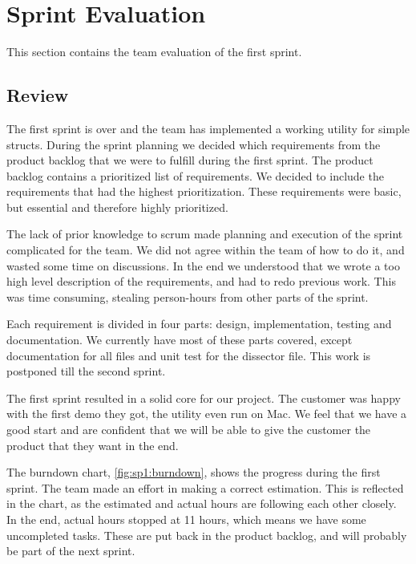 \section{Sprint Evaluation}
\label{sec:sp1:eval}
This section contains the team evaluation of the first sprint.

\subsection{Review}
The first sprint is over and the team has implemented a working \gls{utility} for simple structs. During
the sprint planning we decided which requirements from the product backlog that
we were to fulfill during the first sprint. The product backlog contains a
prioritized list of requirements. We decided to include the requirements that
had the highest prioritization. These requirements were basic, but essential
and therefore highly prioritized.
   
The lack of prior knowledge to \Gls{scrum} made planning and execution of the sprint
complicated for the team. We did not agree within the team of how to do it, and
wasted some time on discussions. In the end we understood
that we wrote a too high level description of the requirements, and had to redo
previous work. This was time consuming, stealing person-hours from other parts
of the sprint.

Each requirement is divided in four parts: design, implementation, testing and
documentation. We currently have most of these parts covered, except
documentation for all files and unit test for the \gls{dissector} file. This work is
postponed till the second sprint.

The first sprint resulted in a solid core for our project. The customer was
happy with the first demo they got, the \gls{utility} even run on Mac.
 We feel that we have a good start and are confident
that we will be able to give the customer the product that they want in the
end.

The burndown chart, \autoref{fig:sp1:burndown}, shows the progress during
the first sprint. The team made an effort in making a correct estimation. This
is reflected in the chart, as the estimated and actual hours are  following
each other closely. In the end, actual hours stopped at 11 hours, which means we
have some uncompleted tasks. These are put back in the product backlog, and will
probably be part of the next sprint. 


